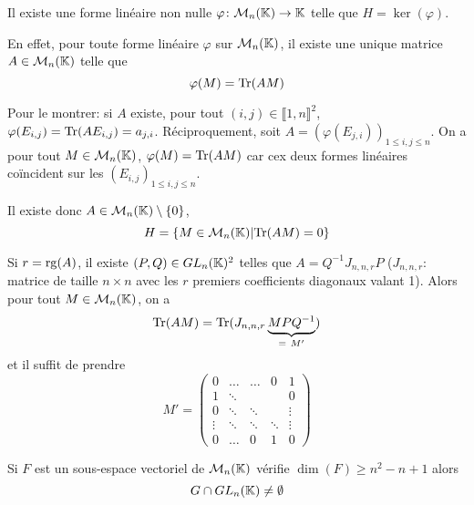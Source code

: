 \begin{remark}
    Il existe une forme linéaire non nulle $\varphi\colon\mathcal{M}_{n}(\mathbb{K})\to \mathbb{K}$ telle que $H=\ker(\varphi)$. 

    En effet, pour toute forme linéaire $\varphi$ sur $\mathcal{M}_{n}(\mathbb{K})$, il existe une unique matrice $A\in\mathcal{M}_{n}(\mathbb{K})$ telle que 
    \begin{equation}
        \varphi(M)=\operatorname{Tr}(AM)
    \end{equation}

    Pour le montrer: si $A$ existe, pour tout $(i,j)\in\llbracket1,n\rrbracket^{2}$, $\varphi(E_{i,j})=\operatorname{Tr}(AE_{i,j})=a_{j,i}$. Réciproquement, soit $A=\left(\varphi(E_{j,i})\right)_{1\leqslant i,j\leqslant n}$. On a pour tout $M\in\mathcal{M}_{n}(\mathbb{K})$, $\varphi(M)=\operatorname{Tr}(AM)$ car cex deux formes linéaires coïncident sur les $(E_{i,j})_{1\leqslant i,j\leqslant n}$.

    Il existe donc $A\in \mathcal{M}_{n}(\mathbb{K})\setminus\lbrace0\rbrace$,
    \begin{equation}
        H=\left\lbrace M\in\mathcal{M}_{n}(\mathbb{K})\middle|\operatorname{Tr}(AM)=0\right\rbrace
    \end{equation}

    Si $r=\operatorname{rg}(A)$, il existe $(P,Q)\in GL_{n}(\mathbb{K})^{2}$ telles que $A=Q^{-1}J_{n,n,r}P$ ($J_{n,n,r}$: matrice de taille $n\times n$ avec les $r$ premiers coefficients diagonaux valant 1). Alors pour tout $M\in \mathcal{M}_{n}(\mathbb{K})$, on a 
    \begin{equation}
        \operatorname{Tr}(AM)=\operatorname{Tr}(J_{n,n,r}\underbrace{MPQ^{-1}}_{=~M'})
    \end{equation}
    et il suffit de prendre 
    \begin{equation}
        M'=
        \begin{pmatrix}
            0 & \dots & \dots & 0 & 1\\
            1 & \ddots & & & 0\\
            0 & \ddots & \ddots& & \vdots\\
            \vdots & \ddots & \ddots&\ddots & \vdots\\
            0 & \dots& 0 & 1 & 0
        \end{pmatrix}
    \end{equation}
\end{remark}

\begin{remark}
    Si $F$ est un sous-espace vectoriel de $\mathcal{M}_{n}(\mathbb{K})$ vérifie $\dim(F)\geqslant n^{2}-n+1$ alors 
    \begin{equation}
        G\cap GL_{n}(\mathbb{K})\neq\emptyset
    \end{equation}
\end{remark}

